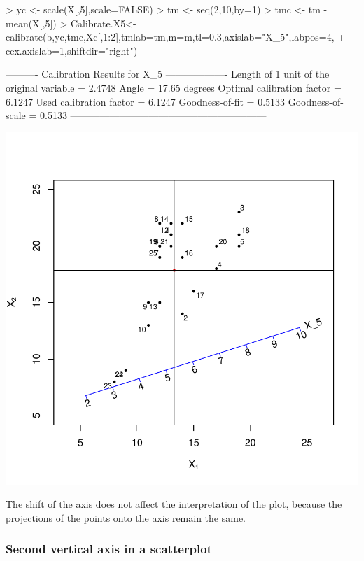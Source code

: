 \documentclass[a4paper]{article}
\begin{document}
\begin{Schunk}
\begin{Sinput}
> yc <- scale(X[,5],scale=FALSE)
> tm <- seq(2,10,by=1)
> tmc <- tm - mean(X[,5])
> Calibrate.X5<-calibrate(b,yc,tmc,Xc[,1:2],tmlab=tm,m=m,tl=0.3,axislab="X_5",labpos=4,
+                         cex.axislab=1,shiftdir="right")
\end{Sinput}
\begin{Soutput}
---------- Calibration Results for  X_5  -------------------
Length of 1 unit of the original variable =  2.4748  
Angle                                     =  17.65 degrees
Optimal calibration factor                =  6.1247  
Used calibration factor                   =  6.1247  
Goodness-of-fit                           =  0.5133  
Goodness-of-scale                         =  0.5133  
------------------------------------------------------------
\end{Soutput}
\end{Schunk}
\includegraphics{CalibrationGuide-007}

The shift of the axis does not affect the interpretation of the plot, because the projections of the points
onto the axis remain the same.

\subsubsection*{Second vertical axis in a scatterplot}
\end{document}
